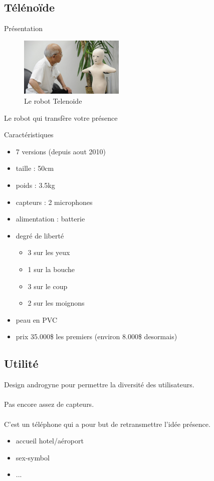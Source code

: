 \documentclass{beamer}
\begin{document}
\subsection{Télénoïde}
\begin{frame}{Présentation}
  \begin{figure}
    \centering
    \includegraphics[width=50mm]{data/telenoid}
    \caption{Le robot Telenoide}
  \end{figure}
  Le robot qui transfère votre présence
\end{frame}

\begin{frame}{Caractéristiques}
  \begin{itemize}
  \item 7 versions (depuis aout 2010)
  \item taille : 50cm
  \item poids : 3.5kg
  \item capteurs : 2 microphones
  \item alimentation : batterie
  \item degré de liberté
    \begin{itemize}
    \item 3 sur les yeux
    \item 1 sur la bouche
    \item 3 sur le coup
    \item 2 sur les moignons
    \end{itemize}
  \item peau en PVC
  \item prix 35.000\$ les premiers (environ 8.000\$ desormais)
  \end{itemize}
\end{frame}

\subsection{Utilité}
\begin{frame}
  Design androgyne pour permettre la diversité des utilisateurs.
  \\~\\
  Pas encore assez de capteurs.
  \\~\\
  C'est un téléphone qui a pour but de retransmettre l'idée présence.
  \\
  \begin{itemize}
  \item accueil hotel/aéroport
  \item sex-symbol
  \item ...
  \end{itemize}
\end{frame}
\end{document}
